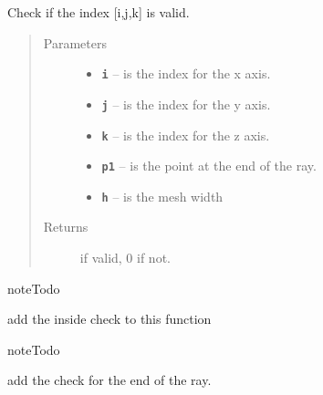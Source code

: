 \documentclass[letterpaper,10pt,english]{sphinxmanual}
\begin{document}
\begin{fulllineitems}
\begin{fulllineitems}
\begin{quote}
\begin{description}
\end{description}\end{quote}

\end{fulllineitems}


\begin{fulllineitems}
\label{index:DictionarySparseMatrix.DS.stopcheck}
Check if the index {[}i,j,k{]} is valid.
\begin{quote}\begin{description}
\item[{Parameters}] \leavevmode\begin{itemize}
\item {} 
\textbf{\texttt{i}} -- is the index for the x axis.

\item {} 
\textbf{\texttt{j}} -- is the index for the y axis.

\item {} 
\textbf{\texttt{k}} -- is the index for the z axis.

\item {} 
\textbf{\texttt{p1}} -- is the point at the end of the ray.

\item {} 
\textbf{\texttt{h}} -- is the mesh width

\end{itemize}

\item[{Returns}]  if valid, 0 if not.

\end{description}\end{quote}

\begin{notice}{note}{Todo}

add the inside check to this function
\end{notice}

\begin{notice}{note}{Todo}

add the check for the end of the ray.
\end{notice}

\end{fulllineitems}



\end{fulllineitems}
\end{document}
